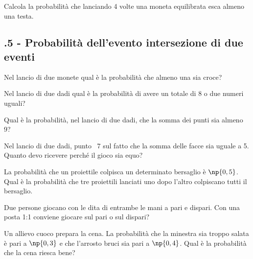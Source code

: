\begin{esercizio}[\Ast]
 \label{ese:9.46}
Calcola la probabilità che lanciando 4 volte una moneta equilibrata esca almeno una testa.
\end{esercizio}

\subsection*{\thechapter.5 - Probabilità dell'evento intersezione di due eventi}

\begin{esercizio}[\Ast]
 \label{ese:9.47}
Nel lancio di due monete qual è la probabilità che almeno una sia croce?
\end{esercizio}

\begin{esercizio}[\Ast]
 \label{ese:9.48}
Nel lancio di due dadi qual è la probabilità di avere un totale di 8 o due numeri uguali?
\end{esercizio}

\begin{esercizio}[\Ast]
 \label{ese:9.49}
Qual è la probabilità, nel lancio di due dadi, che la somma dei punti sia almeno 9?
\end{esercizio}

\begin{esercizio}[\Ast]
 \label{ese:9.50}
Nel lancio di due dadi, punto \officialeuro~$7$ sul fatto che la somma delle facce sia uguale a 5. Quanto devo ricevere perché il gioco sia equo?
\end{esercizio}

\begin{esercizio}[\Ast]
 \label{ese:9.51}
La probabilità che un proiettile colpisca un determinato bersaglio è $\np{0,5}$. Qual è la probabilità che tre proiettili lanciati uno dopo l'altro colpiscano tutti il bersaglio.
\end{esercizio}

\begin{esercizio}[\Ast]
 \label{ese:9.52}
Due persone giocano con le dita di entrambe le mani a pari e dispari. Con una posta 1:1 conviene giocare sul pari o sul dispari?
\end{esercizio}

\begin{esercizio}[\Ast]
 \label{ese:9.53}
Un allievo cuoco prepara la cena. La probabilità che la minestra sia troppo salata è pari a $\np{0,3}$ e che l'arrosto bruci sia pari a $\np{0,4}$. Qual è la probabilità che la cena riesca bene?
\end{esercizio}

